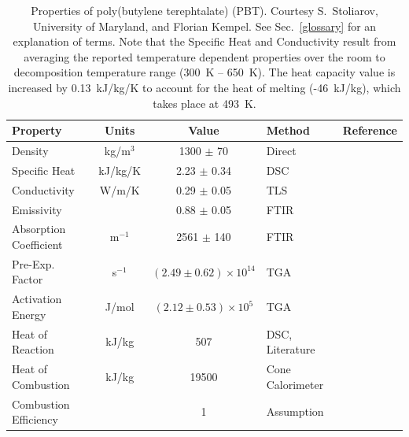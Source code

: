 \begin{table}[h!]
\caption[Properties of poly(butylene terephtalate) (PBT)]{Properties of poly(butylene terephtalate) (PBT). Courtesy S.~Stoliarov, University of Maryland, and
Florian Kempel.
See Sec.~\ref{glossary} for an explanation of terms. Note that the Specific Heat and Conductivity result from averaging the reported temperature dependent
properties over the room to decomposition temperature range (300~K -- 650~K).
The heat capacity value is increased by 0.13~kJ/kg/K to account for the heat of melting (-46~kJ/kg), which takes place at 493~K.}
\begin{center}
\begin{tabular}{|l|c|c|l|l|}
\hline
Property                & Units     & Value                             & Method                                & Reference                     \\ \hline \hline
Density                 & kg/m$^3$  & 1300 $\pm$ 70                     & Direct                                & \cite{Kempel:1}               \\ \hline
Specific Heat           & kJ/kg/K   & 2.23 $\pm$ 0.34                   & DSC                                   & \cite{Kempel:1}               \\ \hline
Conductivity            & W/m/K     & 0.29 $\pm$ 0.05                   & TLS                                   & \cite{Kempel:1}               \\ \hline
Emissivity              &           & 0.88 $\pm$ 0.05                   & FTIR                                  & \cite{Linteris:2}             \\ \hline
Absorption Coefficient  & m$^{-1}$  & 2561 $\pm$ 140                    & FTIR                                  & \cite{Linteris:2}             \\ \hline
Pre-Exp. Factor         & s$^{-1}$  & $(2.49 \pm 0.62) \times 10^{14}$  & TGA                                   & \cite{Kempel:1}               \\ \hline
Activation Energy       & J/mol   & $(2.12 \pm 0.53) \times 10^{5}$   & TGA                                   & \cite{Kempel:1}               \\ \hline
Heat of Reaction        & kJ/kg     & 507                               & DSC, Literature                       & \cite{Kempel:1,Lyon:Ency2005} \\ \hline
Heat of Combustion      & kJ/kg     & 19500                             & Cone Calorimeter                      & \cite{Kempel:1}               \\ \hline
Combustion Efficiency   &           & 1                                 & Assumption                            & \cite{Kempel:1}               \\ \hline
\end{tabular}
\end{center}
\label{Properties_PBT}
\end{table}


